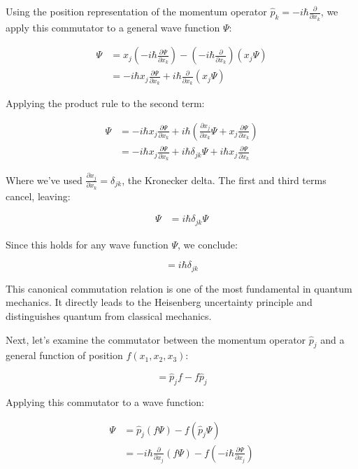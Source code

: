 Using the position representation of the momentum operator $\hat{p}_k = -i\hbar\frac{\partial}{\partial x_k}$, we apply this commutator to a general wave function $\Psi$:

\begin{align}
[x_j, \hat{p}_k]\Psi &= x_j\left(-i\hbar\frac{\partial\Psi}{\partial x_k}\right) - \left(-i\hbar\frac{\partial}{\partial x_k}\right)(x_j\Psi) \\
&= -i\hbar x_j\frac{\partial\Psi}{\partial x_k} + i\hbar\frac{\partial}{\partial x_k}(x_j\Psi)
\end{align}

Applying the product rule to the second term:

\begin{align}
[x_j, \hat{p}_k]\Psi &= -i\hbar x_j\frac{\partial\Psi}{\partial x_k} + i\hbar\left(\frac{\partial x_j}{\partial x_k}\Psi + x_j\frac{\partial\Psi}{\partial x_k}\right)  \\
&= -i\hbar x_j\frac{\partial\Psi}{\partial x_k} + i\hbar\delta_{jk}\Psi + i\hbar x_j\frac{\partial\Psi}{\partial x_k}
\end{align}

Where we've used $\frac{\partial x_j}{\partial x_k} = \delta_{jk}$, the Kronecker delta. The first and third terms cancel, leaving:

\begin{align}
[x_j, \hat{p}_k]\Psi &= i\hbar\delta_{jk}\Psi
\end{align}

Since this holds for any wave function $\Psi$, we conclude:

\begin{equation}
[x_j, \hat{p}_k] = i\hbar\delta_{jk} \label{eq:1.59}
\end{equation}

This canonical commutation relation is one of the most fundamental in quantum mechanics. It directly leads to the Heisenberg uncertainty principle and distinguishes quantum from classical mechanics.

Next, let's examine the commutator between the momentum operator $\hat{p}_j$ and a general function of position $f(x_1,x_2,x_3)$:

\begin{equation}
[\hat{p}_j, f] = \hat{p}_j f - f\hat{p}_j
\end{equation}

Applying this commutator to a wave function:

\begin{align}
[\hat{p}_j, f]\Psi &= \hat{p}_j(f\Psi) - f(\hat{p}_j\Psi) \\
&= -i\hbar\frac{\partial}{\partial x_j}(f\Psi) - f\left(-i\hbar\frac{\partial\Psi}{\partial x_j}\right)
\end{align}

